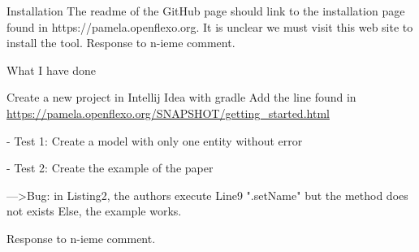 \documentclass[10pt]{article}
\begin{document}
\begin{response}{Installation
The readme of the GitHub page should link to the installation page found in https://pamela.openflexo.org. It is unclear we must visit this web site to install the tool.
}
  Response to n-ieme comment.
\end{response}

\begin{response}{
What I have done

Create a new project in Intellij Idea with gradle
Add the line found in \url{https://pamela.openflexo.org/SNAPSHOT/getting_started.html}

- Test 1: Create a model with only one entity without error

- Test 2: Create the example of the paper

--->Bug: in Listing2, the authors execute Line9 ".setName" but the method does not exists
Else, the example works.


}
  Response to n-ieme comment.
\end{response}
\end{document}
